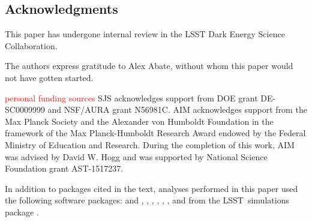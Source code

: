 \documentclass[\docopts]{\docclass}
\newcommand{\proj}[1]{\textsc{#1}}
\newcommand{\lsst}{\proj{LSST}}
\newcommand{\red}[1]{\textcolor{red}{#1}}
\begin{document}









\subsection*{Acknowledgments}


This paper has undergone internal review in the LSST Dark Energy Science Collaboration.%




The authors express gratitude to Alex Abate, without whom this paper would not have gotten started.

{ \red{personal funding sources}}
SJS acknowledges support from DOE grant DE-SC0009999 and NSF/AURA grant N56981C.
AIM acknowledges support from the Max Planck Society and the Alexander von Humboldt Foundation in the framework of the Max Planck-Humboldt Research Award endowed by the Federal Ministry of Education and Research.
During the completion of this work, AIM was advised by David W. Hogg and was supported by National Science Foundation grant AST-1517237.

In addition to packages cited in the text, analyses performed in this paper used the following software packages:  and  \citep{numpyscipy},  \citep{matplotlib},  \citep{seaborn},  \citep{minfunc},  \citep{Malz:qp, Malz:2018},  \citep{pyskynet}, and  from the \lsst\ simulations package \citep{lsstphotutils}.





\end{document}
